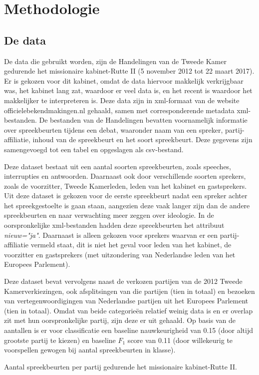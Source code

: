 \section{Methodologie}
\label{sec:meth}


\subsection{De data}
De data die gebruikt worden, zijn de Handelingen van de Tweede Kamer gedurende het missionaire kabinet-Rutte II (5 november 2012 tot 22 maart 2017). Er is gekozen voor dit kabinet, omdat de data hiervoor makkelijk verkrijgbaar was, het kabinet lang zat, waardoor er veel data is, en het recent is waardoor het makkelijker te interpreteren is. Deze data zijn in xml-formaat van de website officielebekendmakingen.nl gehaald, samen met corresponderende metadata xml-bestanden. De bestanden van de Handelingen bevatten voornamelijk informatie over spreekbeurten tijdens een debat, waaronder naam van een spreker, partij-affiliatie, inhoud van de spreekbeurt en het soort spreekbeurt. Deze gegevens zijn samengevoegd tot een tabel en opgeslagen als csv-bestand.\par

Deze dataset bestaat uit een aantal soorten spreekbeurten, zoals speeches, interrupties en antwoorden. Daarnaast ook door verschillende soorten sprekers, zoals de voorzitter, Tweede Kamerleden, leden van het kabinet en gastsprekers. Uit deze dataset is gekozen voor de eerste spreekbeurt nadat een spreker achter het spreekgestoelte is gaan staan, aangezien deze vaak langer zijn dan de andere spreekbeurten en naar verwachting meer zeggen over ideologie. In de oorspronkelijke xml-bestanden hadden deze spreekbeurten het attribuut \textit{nieuw="ja"}.  Daarnaast is alleen gekozen voor sprekers waarvan er een partij-affiliatie vermeld staat, dit is niet het geval voor leden van het kabinet, de voorzitter en gastsprekers  (met uitzondering van Nederlandse leden van het Europees Parlement).\par

Deze dataset bevat vervolgens naast de verkozen partijen van de 2012 Tweede Kamerverkiezingen, ook afsplitsingen van die partijen (tien in totaal) en bezoeken van vertegenwoordigingen van Nederlandse partijen uit het Europees Parlement (tien in totaal). Omdat van beide categorieën relatief weinig data is en er overlap zit met hun oorspronkelijke partij, zijn deze er uit gehaald. Op basis van de aantallen is er voor classificatie een baseline nauwkeurigheid van 0.15 (door altijd grootste partij te kiezen) en baseline $F_1$ score van 0.11 (door willekeurig te voorspellen gewogen bij aantal spreekbeurten in klasse).
\begin{table}[H]
\label{aantallen}
\caption{Aantal spreekbeurten per partij gedurende het missionaire kabinet-Rutte II.}
\centering

\end{table}




